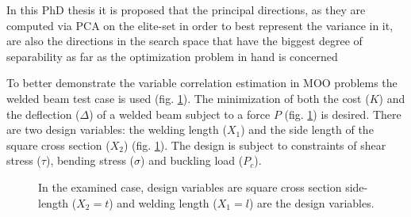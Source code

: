 In this PhD thesis it is proposed that the principal directions, as they are computed via PCA on the elite-set in order to best represent the variance in it, are also the directions in the search space that have the biggest degree of separability as far as the optimization problem in hand is concerned 

To better demonstrate the variable correlation estimation in MOO problems  the welded beam test case is used (fig. \ref{case}).  The minimization of both the cost ($K$) and the deflection ($\Delta$) of a welded beam subject to a force $P$ (fig. \ref{case}) is desired. There are two design variables: the welding length ($X_1$)  and the side length of the square cross section ($X_2$) (fig. \ref{case}). The design is subject to constraints of shear stress ($\tau$), bending stress ($\sigma$) and buckling load ($P_c$).    

\begin{figure}
\begin{minipage}[b]{1\linewidth}
 \centering
\end{minipage}
\caption{In the examined case, design variables are square cross section side-length ($X_2 = t$) and welding length ($X_1 = l$) are the design variables.} 
\label{case}
\end{figure}

